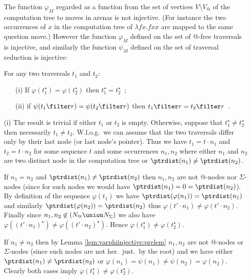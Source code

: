 The function $\varphi_M$ regarded as a function from the set of
vertices $V \setminus V_@$ of the computation tree to moves in
arenas is not injective. (For instance the two occurrences of $x$ in
the computation tree of $\lambda f x. f x x$ are mapped to the same
question move.) However the function $\varphi_M$ defined on the set
of @-free traversals is injective, and similarly the function
$\psi_M$ defined on the set of traversal reduction is injective:

\begin{lemma}
\label{lem:varphiinjective}
For any two traversals $t_1$ and $t_2$:
\begin{itemize}
\item[(i)] If $\varphi (t_1^\star) = \varphi (t_2^\star)$ then $t_1^\star =t_2^\star$\ ;
\item[(ii)] if $\psi (t_1 \filter r ) = \psi (t_2 \filter r )$ then $t_1\filter r = t_2\filter r$\ .
\end{itemize}
\end{lemma}
\proof \noindent (i) The result is trivial if either $t_1$ or $t_2$
is empty. Otherwise, suppose that $t_1^\star\neq t_2^\star$ then
necessarily $t_1 \neq t_2$. W.l.o.g.\ we can assume that the two
traversals differ only by their last node (or last node's pointer).
Thus we have $t_1 = t \cdot n_1$ and $t_2 = t \cdot n_2$ for some
sequence $t$ and some occurrences $n_1, n_2$ where either $n_1$ and
$n_2$ are two distinct node in the computation tree or
$\ptrdist(n_1) \neq \ptrdist(n_2)$.

If $n_1 = n_2$ and $\ptrdist(n_1) \neq \ptrdist(n_2)$ then $n_1,n_2$
are not @-nodes nor $\Sigma$-nodes (since for such nodes we would
have $\ptrdist(n_1) = 0 = \ptrdist(n_2)$). By definition of the
sequence $\varphi(t_1)$ we have $\ptrdist(\varphi(n_1)) =
\ptrdist(n_1)$ and similarly $\ptrdist(\varphi(n_2)) =
\ptrdist(n_2)$ thus $\varphi(t' \cdot n_1) \neq \varphi(t' \cdot
n_2)$. Finally since $n_1,n_2 \not\in (N_@ \union N_\Sigma)$ we also
have $\varphi((t' \cdot n_1)^\star) \neq \varphi((t' \cdot
n_2)^\star)$. Hence $\varphi(t_1^\star) \neq \varphi(t_2^\star)$.

If $n_1 \neq n_2$ then by Lemma \ref{lem:varphiinjective:prelem}
$n_1,n_2$ are not @-nodes or $\Sigma$-nodes (since such nodes are
not her.\ just.\ by the root) and we have either $\ptrdist(n_1) \neq
\ptrdist(n_2)$ or $\varphi(n_1) = \psi(n_1) \neq \psi(n_2) =
\varphi(n_2)$. Clearly both cases imply $\varphi(t_1^\star) \neq
\varphi(t_2^\star)$.
\smallskip

